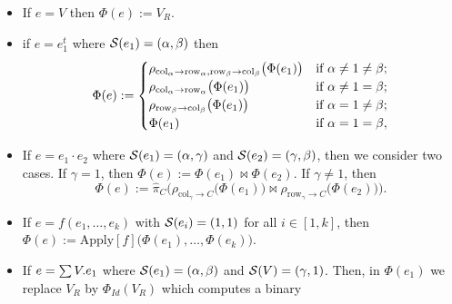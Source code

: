 \begin{itemize}
	\item If $e=V$ then $\Phi(e):=V_R$.
	\item if $e=e_1^t$ where $\mathcal{S}(e_1)=(\alpha,\beta)$ then \[
\Phi(e) :=
\begin{cases}
\rho_{\mathrm{col}_\alpha \to \mathrm{row}_\alpha,\mathrm{row}_\beta \to \mathrm{col}_\beta}\bigl(\Phi(e_1)\bigr) & \text{if } \alpha \neq 1 \neq \beta; \cr
\rho_{\mathrm{col}_\alpha \to \mathrm{row}_\alpha}\bigl(\Phi(e_1)\bigr) & \text{if } \alpha \neq 1 = \beta; \cr
\rho_{\mathrm{row}_\beta \to \mathrm{col}_\beta}\bigl(\Phi(e_1)\bigr) & \text{if } \alpha = 1 \neq \beta; \cr
\Phi(e_1) & \text{if } \alpha = 1 = \beta,
\end{cases}
\]
\item
	If $e = e_1 \cdot e_2$ where $\mathcal{S}(e_1) = (\alpha,\gamma)$ and $\mathcal{S}(e_2) =(\gamma,\beta)$, then we consider two cases. If $\gamma = 1$, then $\Phi(e) := \Phi(e_1) \Join \Phi(e_2)$. If $\gamma \neq 1$, then 
	$$
	\Phi(e) := \hat{\pi}_C\Bigr(\rho_{\mathrm{col}_\gamma\to C}\bigl(\Phi(e_1)\bigr)\Join\rho_{\mathrm{row}_\gamma\to C}\bigl(\Phi(e_2)\bigr)\Bigr).$$
	\item If $e=f(e_1,\ldots,e_k)$ with $\mathcal{S}(e_i)=(1,1)$ for all $i\in[1,k]$, then
	$\Phi(e):=\text{Apply}[f]\bigl(\Phi(e_1),\ldots,\Phi(e_k)\bigr)$. 
	\item If $e=\textstyle\sum V.e_1$ where $\mathcal{S}(e_1)=(\alpha,\beta)$ and $\mathcal{S}(V)=(\gamma,1)$. Then,
	in $\Phi(e_1)$ we replace $V_R$ by $\Phi_{Id}(V_R)$ which computes a binary 

\end{itemize}
